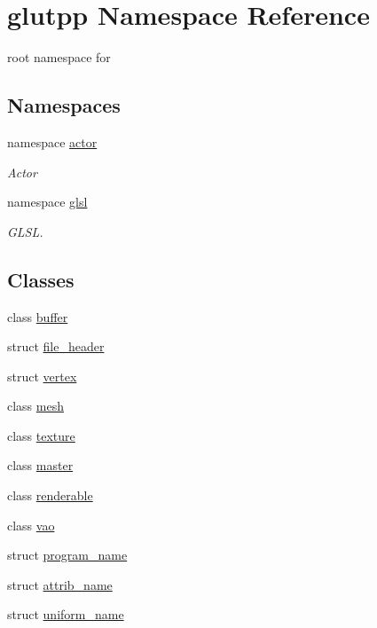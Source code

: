 \hypertarget{namespaceglutpp}{\section{glutpp \-Namespace \-Reference}
\label{namespaceglutpp}
}


root namespace for   


\subsection*{\-Namespaces}
\begin{DoxyCompactItemize}
\item 
namespace \hyperlink{namespaceglutpp_1_1actor}{actor}
\begin{DoxyCompactList}\small\item\em \-Actor \end{DoxyCompactList}\item 
namespace \hyperlink{namespaceglutpp_1_1glsl}{glsl}
\begin{DoxyCompactList}\small\item\em \-G\-L\-S\-L. \end{DoxyCompactList}\end{DoxyCompactItemize}
\subsection*{\-Classes}
\begin{DoxyCompactItemize}
\item 
class \hyperlink{classglutpp_1_1buffer}{buffer}
\item 
struct \hyperlink{structglutpp_1_1file__header}{file\-\_\-header}
\item 
struct \hyperlink{structglutpp_1_1vertex}{vertex}
\item 
class \hyperlink{classglutpp_1_1mesh}{mesh}
\item 
class \hyperlink{classglutpp_1_1texture}{texture}
\item 
class \hyperlink{classglutpp_1_1master}{master}
\item 
class \hyperlink{classglutpp_1_1renderable}{renderable}
\item 
class \hyperlink{classglutpp_1_1vao}{vao}
\item 
struct \hyperlink{structglutpp_1_1program__name}{program\-\_\-name}
\item 
struct \hyperlink{structglutpp_1_1attrib__name}{attrib\-\_\-name}
\item 
struct \hyperlink{structglutpp_1_1uniform__name}{uniform\-\_\-name}
\end{DoxyCompactItemize}

